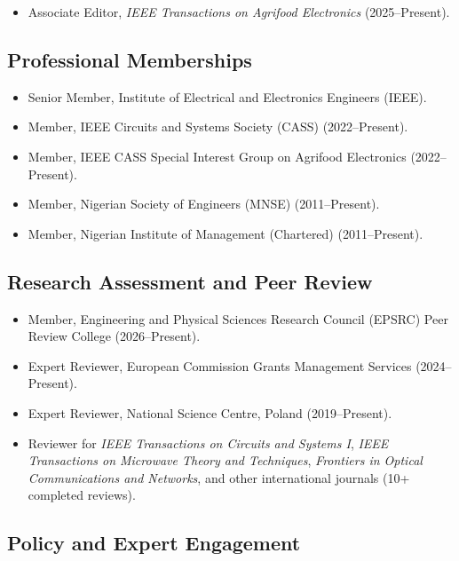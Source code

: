 \documentclass[a4paper,11pt]{article}
\begin{document}
\begin{itemize}
    \item Associate Editor, \emph{IEEE Transactions on Agrifood Electronics} (2025--Present).
\end{itemize}

\subsection*{Professional Memberships}

\begin{itemize}
    \item Senior Member, Institute of Electrical and Electronics Engineers (IEEE).
    \item Member, IEEE Circuits and Systems Society (CASS) (2022--Present).
    \item Member, IEEE CASS Special Interest Group on Agrifood Electronics (2022--Present).
    \item Member, Nigerian Society of Engineers (MNSE) (2011--Present).
    \item Member, Nigerian Institute of Management (Chartered) (2011--Present).
\end{itemize}

\subsection*{Research Assessment and Peer Review}

\begin{itemize}
    \item Member, Engineering and Physical Sciences Research Council (EPSRC) Peer Review College (2026--Present).
    \item Expert Reviewer, European Commission Grants Management Services (2024--Present).
    \item Expert Reviewer, National Science Centre, Poland (2019--Present).
    \item Reviewer for \emph{IEEE Transactions on Circuits and Systems I}, \emph{IEEE Transactions on Microwave Theory and Techniques}, \emph{Frontiers in Optical Communications and Networks}, and other international journals (10+ completed reviews).
\end{itemize}

\subsection*{Policy and Expert Engagement}
\end{document}
